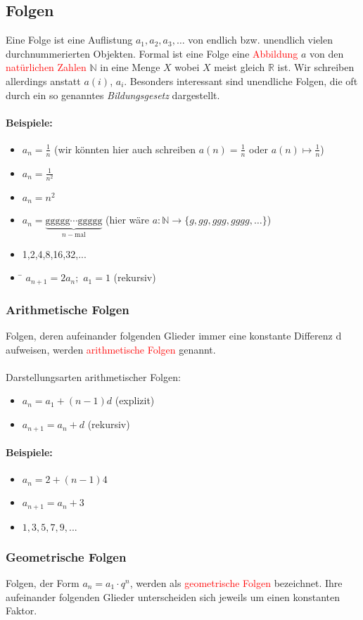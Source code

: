 \subsection{Folgen}
Eine Folge ist eine Auflistung $a_1,a_2,a_3, \ldots$ von endlich bzw. unendlich vielen durchnummerierten Objekten. Formal ist eine Folge eine \textcolor{red}{Abbildung} $a$ von den \textcolor{red}{natürlichen Zahlen} $\mathbb{N}$ in eine Menge $X$ wobei $X$ meist gleich $\mathbb{R}$ ist. Wir schreiben allerdings anstatt $a(i)$, $a_i$. Besonders interessant sind unendliche Folgen, die oft durch ein so genanntes \textit{Bildungsgesetz} dargestellt.

\paragraph{Beispiele:}
\begin{itemize}
\item $a_n = \frac{1}{n}$ (wir könnten hier auch schreiben $a(n) = \frac{1}{n}$ oder $a(n) \mapsto \frac{1}{n}$)
\item $a_n = \frac{1}{n^{2}}$
\item $a_n = n^{2}$
\item $a_n = \underbrace{\text{ggggg} \cdots \text{ggggg}}_{n-\text{mal}}$ (hier wäre $a: \mathbb{N} \to \{g, gg, ggg, gggg, \ldots\}$)
\item 1,2,4,8,16,32,...
\item \begin{tabbing} 
\hspace{3.5 cm}\=\hspace{5 cm}\kill 
$a_{n+1} = 2a_n;$ \>$a_1 = 1$ (rekursiv)
\end{tabbing}
\end{itemize}

\subsubsection{Arithmetische Folgen}
Folgen, deren aufeinander folgenden Glieder immer eine konstante Differenz d aufweisen, werden \textcolor{red}{arithmetische Folgen} genannt.\\\\
Darstellungsarten arithmetischer Folgen:
\begin{itemize}
\item $a_n = a_1 + (n-1)d$ (explizit)
\item $a_{n+1} = a_n + d$ (rekursiv)
\end{itemize}
\paragraph{Beispiele:}\hspace{12 cm}
\begin{itemize}
\item $a_n = 2 + (n-1)4$
\item $a_{n+1} = a_n + 3$
\item $1,3,5,7,9,...$
\end{itemize}

\subsubsection{Geometrische Folgen}
Folgen, der Form $a_n = a_1 \cdot q^{n}$, werden als \textcolor{red}{geometrische Folgen} bezeichnet.
Ihre aufeinander folgenden Glieder unterscheiden sich jeweils um einen konstanten Faktor.
